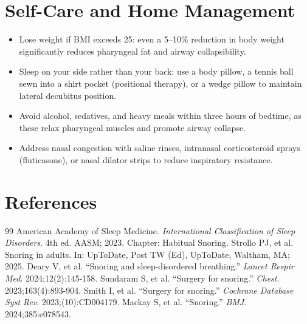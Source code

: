 \section*{Self-Care and Home Management}
\begin{itemize}
  \item Lose weight if BMI exceeds 25: even a 5--10\% reduction in body weight significantly reduces pharyngeal fat and airway collapsibility.
  \item Sleep on your side rather than your back: use a body pillow, a tennis ball sewn into a shirt pocket (positional therapy), or a wedge pillow to maintain lateral decubitus position.
  \item Avoid alcohol, sedatives, and heavy meals within three hours of bedtime, as these relax pharyngeal muscles and promote airway collapse.
  \item Address nasal congestion with saline rinses, intranasal corticosteroid sprays (fluticasone), or nasal dilator strips to reduce inspiratory resistance.
\end{itemize}

\section*{References}
\begin{thebibliography}{99}
 American Academy of Sleep Medicine. \emph{International Classification of Sleep Disorders}. 4th ed. AASM; 2023. Chapter: Habitual Snoring.
 Strollo PJ, et al. Snoring in adults. In: UpToDate, Post TW (Ed), UpToDate, Waltham, MA; 2025.
 Deary V, et al. ``Snoring and sleep-disordered breathing.'' \emph{Lancet Respir Med}. 2024;12(2):145-158.
 Sundaram S, et al. ``Surgery for snoring.'' \emph{Chest}. 2023;163(4):893-904.
 Smith I, et al. ``Surgery for snoring.'' \emph{Cochrane Database Syst Rev}. 2023;(10):CD004179.
 Mackay S, et al. ``Snoring.'' \emph{BMJ}. 2024;385:e078543.
\end{thebibliography}
